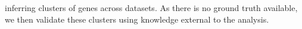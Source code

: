 \documentclass{bmcart}
\begin{document}
inferring clusters of genes across datasets. As there is no ground truth available, we then validate these clusters using knowledge external to the analysis. 

\end{document}
